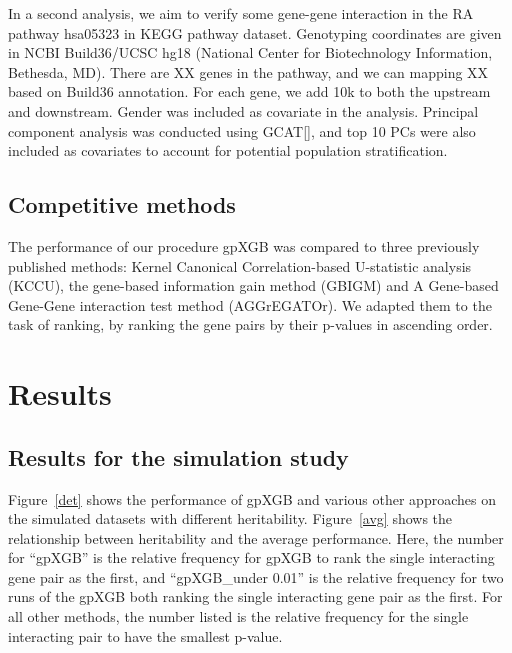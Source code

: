 \documentclass[11pt]{article}
\theoremstyle{plain}
\theoremstyle{definition}
\theoremstyle{remark}
\begin{document}
In a second analysis, we aim to verify some gene-gene interaction in the RA pathway hsa05323 in KEGG pathway dataset. Genotyping coordinates are given in NCBI Build36/UCSC hg18 (National Center for Biotechnology Information, Bethesda, MD). There are XX genes in the pathway, and we can mapping XX based on Build36 annotation. For each gene, we add 10k to both the upstream and downstream. Gender was included as covariate in the analysis. Principal component analysis was conducted using GCAT[], and top 10 PCs were also included as covariates to account for potential population stratification.\\

\subsection{Competitive methods}
The performance of our procedure gpXGB was compared to three previously published methods: Kernel Canonical Correlation-based U-statistic analysis (KCCU)\cite{4, 5}, the gene-based information gain method (GBIGM)\cite{6} and A Gene-based Gene-Gene interaction test method (AGGrEGATOr)\cite{7}. We adapted them to the task of ranking, by ranking the gene pairs by their p-values in ascending order.

\section{Results}

\subsection{Results for the simulation study}

Figure~\ref{det} shows the performance of gpXGB and various other approaches on the simulated datasets with different heritability. Figure~\ref{avg} shows the relationship between heritability and the average performance. Here, the number for ``gpXGB'' is the relative frequency for gpXGB to rank the single interacting gene pair as the first, and ``gpXGB\_under 0.01'' is the relative frequency for two runs of the gpXGB both ranking the single interacting gene pair as the first. For all other methods, the number listed is the relative frequency for the single interacting pair to have the smallest p-value.
\end{document}
